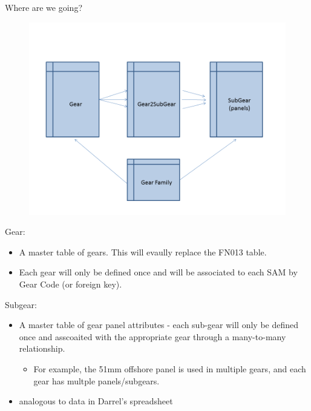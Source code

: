 \documentclass[bigger]{beamer}
\begin{document}
\begin{frame}[label=sec-6]{Where are we going?}
\begin{figure}
\includegraphics[width=\textwidth]{GearTables3}
\end{figure}
\end{frame}


\begin{frame}[label=sec-7]{Gear:}
\begin{itemize}
\item A master table of gears.  This will evaully replace the FN013
table.
\item Each gear will only be defined once and will be associated
to each SAM by Gear Code (or foreign key).
\end{itemize}
\end{frame}

\begin{frame}[label=sec-8]{Subgear:}
\begin{itemize}
\item A master table of gear panel attributes - each sub-gear will only
be defined once and asscoaited with the appropriate gear through a
many-to-many relationship.
\begin{itemize}
\item For example, the 51mm offshore panel is used in multiple gears,
and each gear has multple panels/subgears.
\end{itemize}
\item analogous to data in Darrel's spreadsheet
\end{itemize}
\end{frame}
\end{document}
